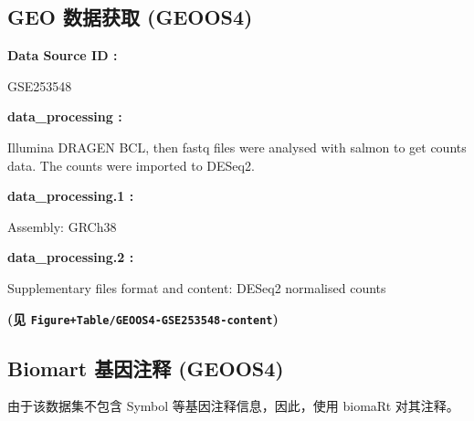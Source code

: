 \documentclass[
]{article}
\begin{document}
\hypertarget{geo-ux6570ux636eux83b7ux53d6-geoos4}{%
\subsection{GEO 数据获取 (GEOOS4)}\label{geo-ux6570ux636eux83b7ux53d6-geoos4}}

\begin{center}\begin{tcolorbox}[colback=gray!10, colframe=gray!50, width=0.9\linewidth, arc=1mm, boxrule=0.5pt]
\textbf{
Data Source ID
:}

\vspace{0.5em}

    GSE253548

\vspace{2em}


\textbf{
data\_processing
:}

\vspace{0.5em}

    Illumina DRAGEN BCL, then fastq files were analysed
with salmon to get counts data. The counts were imported to
DESeq2.

\vspace{2em}


\textbf{
data\_processing.1
:}

\vspace{0.5em}

    Assembly: GRCh38

\vspace{2em}


\textbf{
data\_processing.2
:}

\vspace{0.5em}

    Supplementary files format and content: DESeq2
normalised counts

\vspace{2em}
\end{tcolorbox}
\end{center}

\textbf{(见 \texttt{Figure+Table/GEOOS4-GSE253548-content})}

\hypertarget{biomart-ux57faux56e0ux6ce8ux91ca-geoos4}{%
\subsection{Biomart 基因注释 (GEOOS4)}\label{biomart-ux57faux56e0ux6ce8ux91ca-geoos4}}

由于该数据集不包含 Symbol 等基因注释信息，因此，使用 biomaRt 对其注释。
\end{document}
